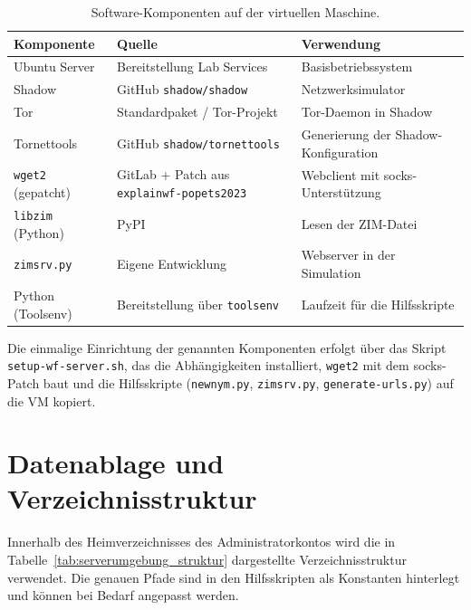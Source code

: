 \begin{table}[H]
\centering
\caption{Software-Komponenten auf der virtuellen Maschine.}
\label{tab:serverumgebung_software}
\begin{tabularx}{\textwidth}{l>{\raggedright\arraybackslash}X>{\raggedright\arraybackslash}X}
\hline
Komponente & Quelle & Verwendung \\
\hline
Ubuntu Server & Bereitstellung Lab Services & Basisbetriebssystem \\
Shadow & GitHub \texttt{shadow/shadow} & Netzwerksimulator \\
Tor & Standardpaket / Tor-Projekt & Tor-Daemon in Shadow \\
Tornettools & GitHub \texttt{shadow/tornettools} & Generierung der Shadow-Konfiguration \\
\texttt{wget2} (gepatcht) & GitLab + Patch aus \texttt{explainwf-popets2023} & Webclient mit \gls{socks}-Unterstützung \\
\texttt{libzim} (Python) & PyPI & Lesen der ZIM-Datei \\
\texttt{zimsrv.py} & Eigene Entwicklung & Webserver in der Simulation \\
Python (Toolsenv) & Bereitstellung über \texttt{toolsenv} & Laufzeit für die Hilfsskripte \\
\hline
\end{tabularx}
\end{table}

Die einmalige Einrichtung der genannten Komponenten erfolgt über das Skript \texttt{setup-wf-server.sh}, das die Abhängigkeiten installiert, \texttt{wget2} mit dem \gls{socks}-Patch baut und die Hilfsskripte (\texttt{newnym.py}, \texttt{zimsrv.py}, \texttt{generate-urls.py}) auf die VM kopiert.

\section{Datenablage und Verzeichnisstruktur}
\label{app:serverumgebung_struktur}

Innerhalb des Heimverzeichnisses des Administratorkontos wird die in Tabelle~\ref{tab:serverumgebung_struktur} dargestellte Verzeichnisstruktur verwendet.
Die genauen Pfade sind in den Hilfsskripten als Konstanten hinterlegt und können bei Bedarf angepasst werden.

